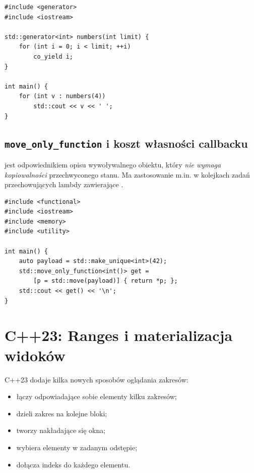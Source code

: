 \begin{lstlisting}[caption={Leniwy generator liczb calkowitych (C++23; wymaga <generator>).}]
#include <generator>
#include <iostream>

std::generator<int> numbers(int limit) {
    for (int i = 0; i < limit; ++i)
        co_yield i;
}

int main() {
    for (int v : numbers(4))
        std::cout << v << ' ';
}
\end{lstlisting}

\subsection{\texttt{move\_only\_function} i koszt własności callbacku}

 jest odpowiednikiem
opisu wywoływalnego obiektu, który \emph{nie wymaga kopiowalności}
przechwyconego stanu. Ma zastosowanie m.in. w kolejkach zadań
przechowujących lambdy zawierające .

\begin{lstlisting}[caption={Callback z obiektem posiadajacym wylaczna wlasnosc (C++23).}]
#include <functional>
#include <iostream>
#include <memory>
#include <utility>

int main() {
    auto payload = std::make_unique<int>(42);
    std::move_only_function<int()> get =
        [p = std::move(payload)] { return *p; };
    std::cout << get() << '\n';
}
\end{lstlisting}

\section{C++23: Ranges i materializacja widoków}
\label{sec:cpp21-ranges}

C++23 dodaje kilka nowych sposobów oglądania zakresów:
\begin{itemize}
\item {} łączy odpowiadające sobie elementy kilku zakresów;
\item {} dzieli zakres na kolejne bloki;
\item {} tworzy nakładające się okna;
\item {} wybiera elementy w zadanym odstępie;
\item {} dołącza indeks do każdego elementu.
\end{itemize}

